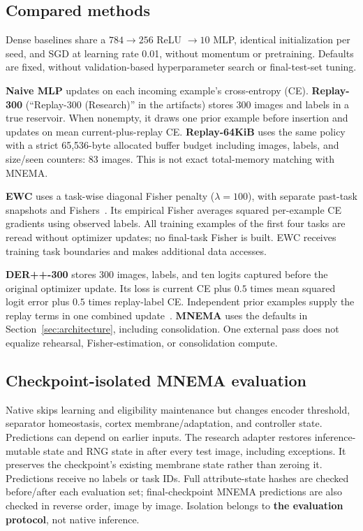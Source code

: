 \documentclass[10pt,a4paper]{article}
\newcommand{\code}[1]{\texttt{\detokenize{#1}}}
\begin{document}
\subsection{Compared methods}
Dense baselines share a $784\rightarrow256$ ReLU $\rightarrow10$ \code{float32}
MLP, identical initialization per seed, and SGD at learning rate 0.01, without
momentum or pretraining. Defaults are fixed, without validation-based
hyperparameter search or final-test-set tuning.

\textbf{Naive MLP} updates on each incoming example's cross-entropy (CE).
\textbf{Replay-300} (``Replay-300 (Research)'' in the artifacts) stores 300
\code{uint8} images and labels in a true reservoir. When nonempty, it draws one
prior example before insertion and updates on mean current-plus-replay CE.
\textbf{Replay-64KiB} uses the same policy with a strict 65,536-byte allocated
buffer budget including images, labels, and size/seen counters: 83 images.
This is not exact total-memory matching with MNEMA.

\textbf{EWC} uses a task-wise diagonal Fisher penalty ($\lambda=100$), with
separate past-task snapshots and Fishers~\citep{kirkpatrick2017}. Its empirical
Fisher averages squared per-example CE gradients using observed labels. All
training examples of the first four tasks are reread without optimizer updates;
no final-task Fisher is built. EWC receives training task boundaries and makes
additional data accesses.

\textbf{DER++-300} stores 300 images, labels, and ten \code{float32} logits
captured before the original optimizer update. Its loss is current CE plus
$0.5$ times mean squared logit error plus $0.5$ times replay-label CE.
Independent prior examples supply the replay terms in one combined
update~\citep{buzzega2020}. \textbf{MNEMA} uses the defaults in
Section~\ref{sec:architecture}, including consolidation. One external pass
does not equalize rehearsal, Fisher-estimation, or consolidation compute.

\subsection{Checkpoint-isolated MNEMA evaluation}
Native \code{is_training=False} skips learning and eligibility maintenance but
changes encoder threshold, separator homeostasis, cortex membrane/adaptation,
and controller state. Predictions can depend on earlier inputs. The research
adapter restores inference-mutable state and RNG state in \code{finally} after
every test image, including exceptions. It preserves the checkpoint's existing
membrane state rather than zeroing it. Predictions receive no labels or task IDs.
Full attribute-state hashes are checked before/after each evaluation set;
final-checkpoint MNEMA predictions are also checked in reverse order, image by
image. Isolation belongs to \textbf{the evaluation protocol}, not native inference.
\end{document}

